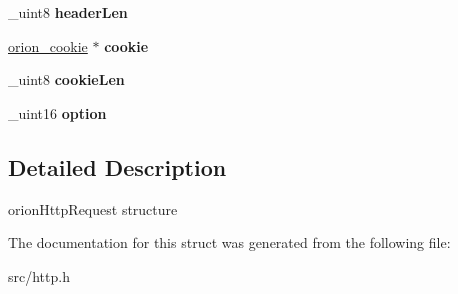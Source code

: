 \begin{DoxyCompactItemize}
\item 
\hypertarget{structorion__httpRequest_a63b5d516af47ebd4bc0301d0433fee74}{
\_\-uint8 {\bfseries headerLen}}
\label{structorion__httpRequest_a63b5d516af47ebd4bc0301d0433fee74}

\item 
\hypertarget{structorion__httpRequest_a9adba13db1d2db15bcd6636b2c01a5f2}{
\hyperlink{structorion__cookie}{orion\_\-cookie} $\ast$ {\bfseries cookie}}
\label{structorion__httpRequest_a9adba13db1d2db15bcd6636b2c01a5f2}

\item 
\hypertarget{structorion__httpRequest_ae76edadeb134faa75a7d8d0477748cad}{
\_\-uint8 {\bfseries cookieLen}}
\label{structorion__httpRequest_ae76edadeb134faa75a7d8d0477748cad}

\item 
\hypertarget{structorion__httpRequest_a4eb4a9c724a8e7452422d37ed58b1b22}{
\_\-uint16 {\bfseries option}}
\label{structorion__httpRequest_a4eb4a9c724a8e7452422d37ed58b1b22}

\end{DoxyCompactItemize}


\subsection{Detailed Description}
orionHttpRequest structure 

The documentation for this struct was generated from the following file:\begin{DoxyCompactItemize}
\item 
src/http.h\end{DoxyCompactItemize}

